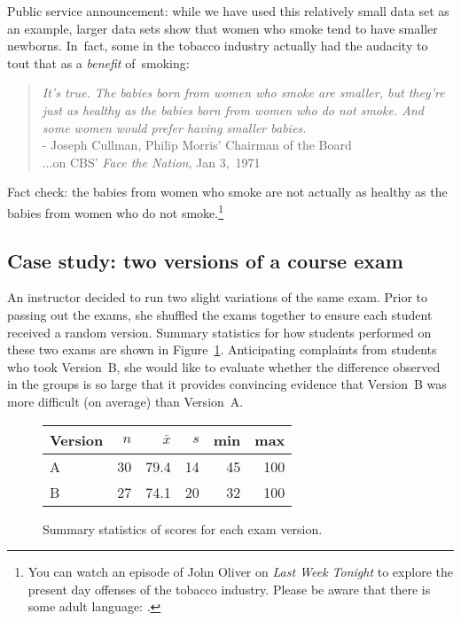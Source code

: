 Public service announcement: while we have used this relatively
small data set as an example, larger data sets show that women
who smoke tend to have smaller newborns.
In~fact, some in the tobacco industry actually had the audacity
to tout that as a \emph{benefit} of~smoking:
\begin{quotation}
  \noindent%
  \emph{It's true.
  The babies born from women who smoke are smaller,
  but they're just as healthy as the babies born from
  women who do not smoke.
  And some women would prefer having smaller babies.} \\[2mm]
  \indent\indent\indent\indent\indent\indent%
    - Joseph Cullman, Philip Morris' Chairman of the Board \\
  \indent\indent\indent\indent\indent\indent%
  {\color{white}...}on CBS' \emph{Face the Nation}, Jan 3,~1971
\end{quotation}
Fact check: the babies from women who smoke are not actually
as healthy as the babies from women who do not
smoke.\footnote{You can watch an episode of John Oliver
  on \emph{Last Week Tonight} to explore the present day
  offenses of the tobacco industry.
  Please be aware that there is some adult language:
  .}



\D{\newpage}

\subsection{Case study: two versions of a course exam}


An instructor decided to run two slight variations of the same exam. Prior to passing out the exams, she shuffled the exams together to ensure each student received a random version. Summary statistics for how students performed on these two exams are shown in Figure~\ref{summaryStatsForTwoVersionsOfExams}. Anticipating complaints from students who took Version~B, she would like to evaluate whether the difference observed in the groups is so large that it provides convincing evidence that Version~B was more difficult (on average) than Version~A.

\begin{figure}[hht]
\centering
\begin{tabular}{l rrrrr}
\hline
Version\hspace{2mm}	& $n$	& $\bar{x}$	& $s$	& min	& max  \\
\hline
A		& 30		& 79.4		& 14 	& 45		& 100 \\
B		& 27		& 74.1		& 20		& 32		& 100 \\
\hline
\end{tabular}
\caption{Summary statistics of scores for each exam version.}
\label{summaryStatsForTwoVersionsOfExams}
\end{figure}

